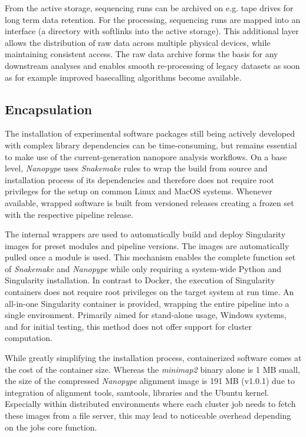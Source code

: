 From the active storage, sequencing runs can be archived on e.g. tape drives for long term data retention. For the processing, sequencing runs are mapped into an interface (a directory with softlinks into the active storage). This additional layer allows the distribution of raw data across multiple physical devices, while maintaining consistent access.
The raw data archive forms the basis for any downstream analyses and enables smooth re-processing of legacy datasets as soon as for example improved basecalling algorithms become available.


\subsection{Encapsulation}
\label{subsec:nanopype:encapsulation}
The installation of experimental software packages still being actively developed with complex library dependencies can be time-consuming, but remains essential to make use of the current-generation nanopore analysis workflows. On a base level, \textit{Nanopype} uses \textit{Snakemake} rules to wrap the build from source and installation process of its dependencies and therefore does not require root privileges for the setup on common Linux and MacOS systems. Whenever available, wrapped software is built from versioned releases creating a frozen set with the respective pipeline release.

The internal wrappers are used to automatically build and deploy Singularity images for preset modules and pipeline versions. The images are automatically pulled once a module is used. This mechanism enables the complete function set of \textit{Snakemake} and \textit{Nanopype} while only requiring a system-wide Python and Singularity installation. In contrast to Docker, the execution of Singularity containers does not require root privileges on the target system at run time.
An all-in-one Singularity container is provided, wrapping the entire pipeline into a single environment. Primarily aimed for stand-alone usage, Windows systems, and for initial testing, this method does not offer support for cluster computation.

While greatly simplifying the installation process, containerized software comes at the cost of the container size. Whereas the \textit{minimap2} binary alone is 1 MB small, the size of the compressed \textit{Nanopype} alignment image is 191 MB (v1.0.1) due to integration of alignment tools, samtools, libraries and the Ubuntu kernel. Especially within distributed environments where each cluster job needs to fetch these images from a file server, this may lead to noticeable overhead depending on the jobs core function.


